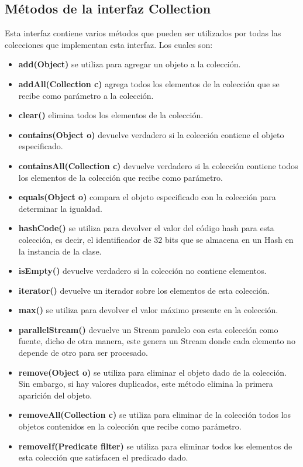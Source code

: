 \documentclass{report}
\begin{document}
\subsection*{Métodos de la interfaz Collection}
Esta interfaz contiene varios métodos que pueden ser utilizados por todas las colecciones que implementan esta interfaz. Los cuales son:
\begin{itemize}
    \item \textbf{add(Object)} se utiliza para agregar un objeto a la colección.
    \item \textbf{addAll(Collection c)} agrega todos los elementos de la colección que se recibe como parámetro a la colección.
    \item \textbf{clear()} elimina todos los elementos de la colección.
    \item \textbf{contains(Object o)} devuelve verdadero si la colección contiene el objeto especificado.
    \item \textbf{containsAll(Collection c) }devuelve verdadero si la colección contiene todos los elementos de la colección que recibe como parámetro.
    \item \textbf{equals(Object o)} compara el objeto especificado con la colección para determinar la igualdad.
    \item \textbf{hashCode()} se utiliza para devolver el valor del código hash para esta colección, es decir, el identificador de 32 bits que se almacena en un Hash en la instancia de la clase.
    \item \textbf{isEmpty()} devuelve verdadero si la colección no contiene elementos.
    \item \textbf{iterator()} devuelve un iterador sobre los elementos de esta colección.
    \item \textbf{max()} se utiliza para devolver el valor máximo presente en la colección.
    \item \textbf{parallelStream()} devuelve un Stream paralelo con esta colección como fuente, dicho de otra manera, este genera un Stream donde cada elemento no depende de otro para ser procesado.
    \item \textbf{remove(Object o)} se utiliza para eliminar el objeto dado de la colección. Sin embargo, si hay valores duplicados, este método elimina la primera aparición del objeto.
    \item \textbf{removeAll(Collection c)} se utiliza para eliminar de la colección todos los objetos contenidos en la colección que recibe como parámetro.
    \item \textbf{removeIf(Predicate filter)} se utiliza para eliminar todos los elementos de esta colección que satisfacen el predicado dado.

\end{itemize}
\end{document}
